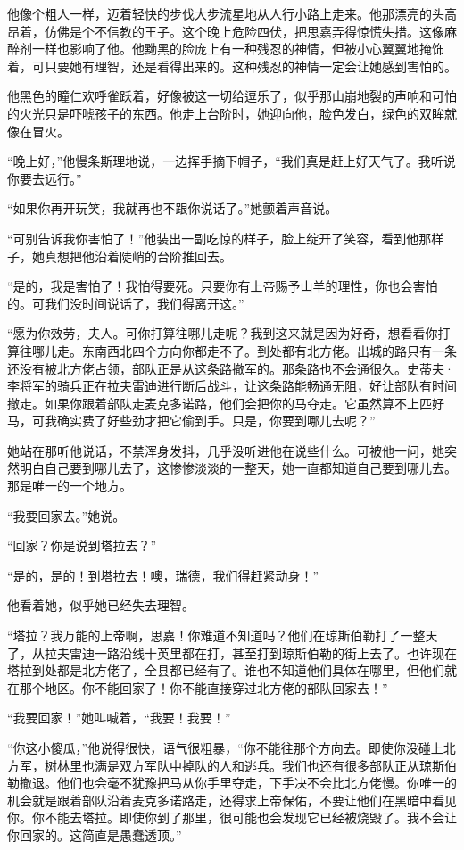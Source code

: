 \par 他像个粗人一样，迈着轻快的步伐大步流星地从人行小路上走来。他那漂亮的头高昂着，仿佛是个不信教的王子。这个晚上危险四伏，把思嘉弄得惊慌失措。这像麻醉剂一样也影响了他。他黝黑的脸庞上有一种残忍的神情，但被小心翼翼地掩饰着，可只要她有理智，还是看得出来的。这种残忍的神情一定会让她感到害怕的。
\par 他黑色的瞳仁欢呼雀跃着，好像被这一切给逗乐了，似乎那山崩地裂的声响和可怕的火光只是吓唬孩子的东西。他走上台阶时，她迎向他，脸色发白，绿色的双眸就像在冒火。
\par “晚上好，”他慢条斯理地说，一边挥手摘下帽子，“我们真是赶上好天气了。我听说你要去远行。”
\par “如果你再开玩笑，我就再也不跟你说话了。”她颤着声音说。
\par “可别告诉我你害怕了！”他装出一副吃惊的样子，脸上绽开了笑容，看到他那样子，她真想把他沿着陡峭的台阶推回去。
\par “是的，我是害怕了！我怕得要死。只要你有上帝赐予山羊的理性，你也会害怕的。可我们没时间说话了，我们得离开这。”
\par “愿为你效劳，夫人。可你打算往哪儿走呢？我到这来就是因为好奇，想看看你打算往哪儿走。东南西北四个方向你都走不了。到处都有北方佬。出城的路只有一条还没有被北方佬占领，部队正是从这条路撤军的。那条路也不会通很久。史蒂夫·李将军的骑兵正在拉夫雷迪进行断后战斗，让这条路能畅通无阻，好让部队有时间撤走。如果你跟着部队走麦克多诺路，他们会把你的马夺走。它虽然算不上匹好马，可我确实费了好些劲才把它偷到手。只是，你要到哪儿去呢？”
\par 她站在那听他说话，不禁浑身发抖，几乎没听进他在说些什么。可被他一问，她突然明白自己要到哪儿去了，这惨惨淡淡的一整天，她一直都知道自己要到哪儿去。那是唯一的一个地方。
\par “我要回家去。”她说。
\par “回家？你是说到塔拉去？”
\par “是的，是的！到塔拉去！噢，瑞德，我们得赶紧动身！”
\par 他看着她，似乎她已经失去理智。
\par “塔拉？我万能的上帝啊，思嘉！你难道不知道吗？他们在琼斯伯勒打了一整天了，从拉夫雷迪一路沿线十英里都在打，甚至打到琼斯伯勒的街上去了。也许现在塔拉到处都是北方佬了，全县都已经有了。谁也不知道他们具体在哪里，但他们就在那个地区。你不能回家了！你不能直接穿过北方佬的部队回家去！”
\par “我要回家！”她叫喊着，“我要！我要！”
\par “你这小傻瓜，”他说得很快，语气很粗暴，“你不能往那个方向去。即使你没碰上北方军，树林里也满是双方军队中掉队的人和逃兵。我们也还有很多部队正从琼斯伯勒撤退。他们也会毫不犹豫把马从你手里夺走，下手决不会比北方佬慢。你唯一的机会就是跟着部队沿着麦克多诺路走，还得求上帝保佑，不要让他们在黑暗中看见你。你不能去塔拉。即使你到了那里，很可能也会发现它已经被烧毁了。我不会让你回家的。这简直是愚蠢透顶。”
